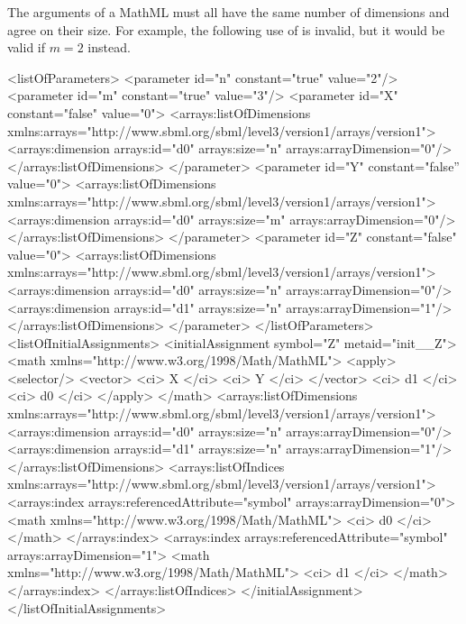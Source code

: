 The arguments of a MathML  must all have the same number
of dimensions and agree on their size.   For example, the following use
of  is invalid, but it would be valid if $m=2$ instead.

\begin{example}[showstringspaces=false]
<listOfParameters>
    <parameter id="n" constant="true" value="2"/>
    <parameter id="m" constant="true" value="3"/>
    <parameter id="X" constant="false" value="0">
        <arrays:listOfDimensions
            xmlns:arrays="http://www.sbml.org/sbml/level3/version1/arrays/version1">
            <arrays:dimension arrays:id="d0" arrays:size="n" arrays:arrayDimension="0"/>
        </arrays:listOfDimensions>
    </parameter>
    <parameter id="Y" constant="false'' value="0">
        <arrays:listOfDimensions
            xmlns:arrays="http://www.sbml.org/sbml/level3/version1/arrays/version1">
            <arrays:dimension arrays:id="d0" arrays:size="m" arrays:arrayDimension="0"/>
        </arrays:listOfDimensions>
    </parameter>
    <parameter id="Z" constant="false" value="0">
        <arrays:listOfDimensions
            xmlns:arrays="http://www.sbml.org/sbml/level3/version1/arrays/version1">
            <arrays:dimension arrays:id="d0" arrays:size="n" arrays:arrayDimension="0"/>
            <arrays:dimension arrays:id="d1" arrays:size="n" arrays:arrayDimension="1"/>
        </arrays:listOfDimensions>
    </parameter>
</listOfParameters>
<listOfInitialAssignments>
    <initialAssignment symbol="Z" metaid="init__Z">
        <math
            xmlns="http://www.w3.org/1998/Math/MathML">
            <apply>
                <selector/>
                <vector>
                    <ci> X </ci>
                    <ci> Y </ci>
                </vector>
                <ci> d1 </ci>
                <ci> d0 </ci>
            </apply>
        </math>
        <arrays:listOfDimensions
            xmlns:arrays="http://www.sbml.org/sbml/level3/version1/arrays/version1">
            <arrays:dimension arrays:id="d0" arrays:size="n" arrays:arrayDimension="0"/>
            <arrays:dimension arrays:id="d1" arrays:size="n" arrays:arrayDimension="1"/>
        </arrays:listOfDimensions>
        <arrays:listOfIndices
            xmlns:arrays="http://www.sbml.org/sbml/level3/version1/arrays/version1">
            <arrays:index arrays:referencedAttribute="symbol" arrays:arrayDimension="0">
                <math
                    xmlns="http://www.w3.org/1998/Math/MathML">
                    <ci> d0 </ci>
                </math>
            </arrays:index>
            <arrays:index arrays:referencedAttribute="symbol" arrays:arrayDimension="1">
                <math
                    xmlns="http://www.w3.org/1998/Math/MathML">
                    <ci> d1 </ci>
                </math>
            </arrays:index>
        </arrays:listOfIndices>
    </initialAssignment>
</listOfInitialAssignments>
\end{example}

